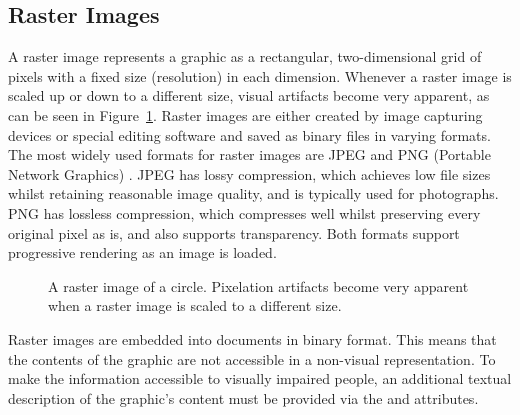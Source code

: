 \subsection{Raster Images}
\label{sec:RasterImages}

A raster image represents a graphic as a rectangular, two-dimensional
grid of pixels with a fixed size (resolution) in each dimension.
Whenever a raster image is scaled up or down to a different size,
visual artifacts become very apparent, as can be seen in
Figure~\ref{fig:RasterImage}. Raster images are either created by
image capturing devices or special editing software and saved as
binary files in varying formats. The most widely used formats for
raster images are JPEG \parencite{JPEG} and PNG (Portable Network
Graphics) \parencite{PNG}. JPEG has lossy compression, which achieves
low file sizes whilst retaining reasonable image quality, and is
typically used for photographs. PNG has lossless compression, which
compresses well whilst preserving every original pixel as is, and also
supports transparency. Both formats support progressive rendering as
an image is loaded.


\begin{figure}[tp]
\centering
{}
\hspace{1cm}
\caption[Raster Image Scaling]{%
A raster image of a circle.
Pixelation artifacts become very apparent when a raster image
is scaled to a different size.
}
\label{fig:RasterImage}
\end{figure}


Raster images are embedded into documents in binary format. This means
that the contents of the graphic are not accessible in a non-visual
representation. To make the information accessible to visually
impaired people, an additional textual description of the graphic's
content must be provided via the  and
 attributes.






